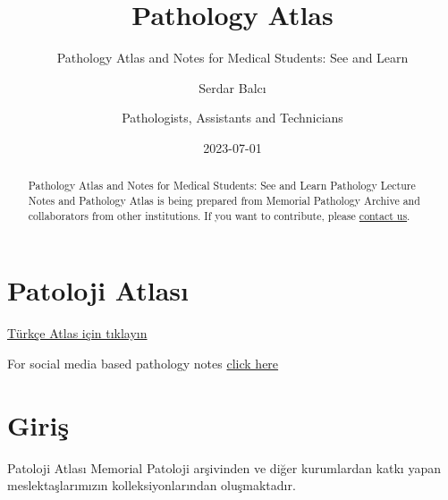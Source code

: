 \documentclass[
  letterpaper,
  paper=6in:9in,
  pagesize=pdftex,
  headinclude=on,
  footinclude=on,
  12pt]{scrbook}
\title{Pathology Atlas}
\subtitle{Pathology Atlas and Notes for Medical Students: See and Learn}
\author{Serdar Balcı \and Pathologists, Assistants and Technicians}
\date{2023-07-01}
\renewcommand*\contentsname{Table of contents}
\newcommand\contentsname{Table of contents}
\begin{document}
\frontmatter
\maketitle
\begin{abstract}
Pathology Atlas and Notes for Medical Students: See and Learn Pathology
Lecture Notes and Pathology Atlas is being prepared from Memorial
Pathology Archive and collaborators from other institutions. If you want
to contribute, please
\href{https://www.patolojiatlasi.com/katki.html}{contact us}.
\end{abstract}

\ifdefined\Shaded\renewenvironment{Shaded}{\begin{tcolorbox}[breakable, enhanced, sharp corners, boxrule=0pt, borderline west={3pt}{0pt}{shadecolor}, frame hidden, interior hidden]}{\end{tcolorbox}}\fi

\renewcommand*\contentsname{İçindekiler}
{
\hypersetup{linkcolor=}
\setcounter{tocdepth}{2}
\tableofcontents
}
\mainmatter
{}

\hypertarget{sec-patoloji-atlasi}{%
\chapter*{Patoloji Atlası}\label{sec-patoloji-atlasi}}


\href{https://www.patolojiatlasi.com/}{Türkçe Atlas için tıklayın}

For social media based pathology notes
\href{https://www.patolojinotlari.com/}{click here}


\hypertarget{sec-giris}{%
\chapter*{Giriş}\label{sec-giris}}


Patoloji Atlası Memorial Patoloji arşivinden ve diğer kurumlardan katkı
yapan meslektaşlarımızın kolleksiyonlarından oluşmaktadır.\\
\end{document}
